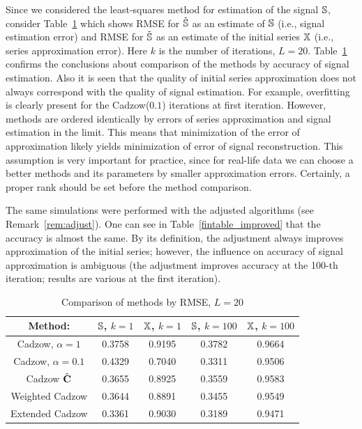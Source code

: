 \documentclass[sii]{ipart}
\begin{document}
\smallskip
Since we considered the least-squares method for estimation of the signal $\mathbb{S}$, consider Table~\ref{fintable} which shows RMSE for $\tilde {\mathbb{S}}$ as an estimate of $\mathbb{S}$ (i.e., signal estimation error) and RMSE for $\tilde {\mathbb{S}}$ as an estimate of the initial series $\mathbb{X}$ (i.e., series approximation error). Here $k$ is the number of iterations, $L=20$. Table~\ref{fintable} confirms the conclusions about comparison of the methods by accuracy of signal estimation. Also it is seen that the quality of initial series approximation does not always correspond with the quality of signal estimation. For example, overfitting is clearly present for the Cadzow($0.1$) iterations at first iteration. However, methods are ordered identically by errors of series approximation and signal estimation in the limit. This means that minimization of the error of approximation likely yields minimization of error of signal reconstruction.
This assumption is very important for practice, since for real-life data we can choose a better methods and its parameters by smaller approximation errors.
Certainly, a proper rank should be set before the method comparison.

The same simulations were performed with the adjusted algorithms (see Remark~\ref{rem:adjust}). One can see in Table~\ref{fintable_improved} that the accuracy is almost the same. By its definition, the adjustment always improves approximation of the initial series; however, the influence on accuracy of signal approximation is ambiguous (the adjustment improves accuracy at the 100-th iteration; results are various at the first iteration).

\begin{table}
		\caption{Comparison of methods by RMSE, $L = 20$}\label{fintable}

		\begin{tabular*}{\textwidth}{@{\extracolsep{\fill}}ccccc}
			\hline
			Method: & $\mathbb{S}$, $k = 1$ & $\mathbb{X}$, $k = 1$ & $\mathbb{S}$, $k = 100$ & $\mathbb{X}$, $k = 100$  \\
			\hline
			Cadzow, $\alpha = 1$ & 0.3758 & 0.9195 & 0.3782 & 0.9664 \\
			\hline
			Cadzow, $\alpha = 0.1$ & 0.4329 & 0.7040 & 0.3311 & 0.9506 \\
			\hline
			Cadzow $\hat{\mathbf{C}}$ & 0.3655 & 0.8925 & 0.3559 & 0.9583 \\
			\hline
			Weighted Cadzow & 0.3644 & 0.8891 & 0.3455 & 0.9549 \\
			\hline
			Extended Cadzow & 0.3361 & 0.9030 & 0.3189 & 0.9471 \\
			\hline
		\end{tabular*}
\end{table}
\end{document}
